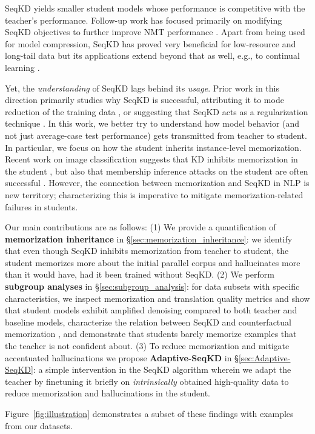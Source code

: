 \label{fig:illustration}
SeqKD yields smaller student models whose performance is competitive with the teacher's performance.
Follow-up work has focused primarily on modifying SeqKD objectives to further improve NMT performance \citep[e.g.,][]{wen2023f,zhang-etal-2023-towards-understanding,wang2023better,wang2024don}.
Apart from being used for model compression, SeqKD has proved very beneficial for low-resource and long-tail data \citep{dabre2020combining,currey2020distilling,gumma2023empirical,zhou2024multi,de2024hybrid} but its applications extend beyond that as well, e.g., to continual learning \citep{chuang2020lifelong, zhao2022life}.

Yet, the \textit{understanding} of SeqKD lags behind its \textit{usage}.
Prior work in this direction primarily studies why SeqKD is successful, attributing it to mode reduction of the training data \citep{zhouunderstanding,song2021data}, or suggesting that SeqKD acts as a regularization technique \citep{gordon2019explaining}. In this work, we better try to understand how model behavior (and not just average-case test performance) gets transmitted from teacher to student.
In particular, we focus on how the student inherits instance-level memorization.
Recent work on image classification suggests that KD inhibits memorization in the student \citep{lukasiklarger}, but also that membership inference attacks on the student are often successful \citep{jagielski2024students}.
However, the connection between memorization and SeqKD in NLP is new territory; characterizing this is imperative to mitigate memorization-related failures in students.

Our main contributions are as follows: (1) We provide a quantification of \textbf{memorization inheritance} in \S\ref{sec:memorization_inheritance}: we identify that even though SeqKD inhibits memorization from teacher to student, the student memorizes more about the initial parallel corpus and hallucinates more than it would have, had it been trained without SeqKD.
(2) We perform \textbf{subgroup analyses} in \S\ref{sec:subgroup_analysis}: for data subsets with specific characteristics, we inspect memorization and translation quality metrics and show that student models exhibit amplified denoising compared to both teacher and baseline models, characterize the relation between SeqKD and counterfactual memorization \citep{feldman2020does}, and demonstrate that students barely memorize examples that the teacher is not confident about.
(3) To reduce memorization and mitigate accentuated hallucinations we propose \textbf{Adaptive-SeqKD} in \S\ref{sec:Adaptive-SeqKD}: a simple intervention in the SeqKD algorithm wherein we adapt the teacher by finetuning it briefly on \textit{intrinsically} obtained high-quality data to reduce memorization and hallucinations in the student.

Figure~\ref{fig:illustration} demonstrates a subset of these findings with examples from our datasets.
